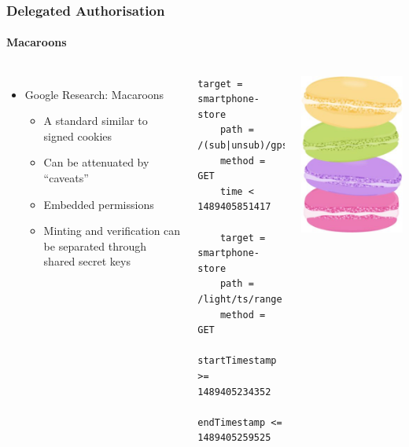 \documentclass[aspectratio=169]{beamer}
\begin{document}
\begin{frame}[fragile]
	\frametitle{Delegated Authorisation}
	\framesubtitle{Macaroons}
	\begin{columns}[c]
		\begin{itemize}
			\item Google Research: Macaroons
			\begin{itemize}
				\item A standard similar to signed cookies
				\item Can be attenuated by ``caveats''
				\item Embedded permissions
				\item Minting and verification can be separated through shared secret keys
			\end{itemize}
		\end{itemize}
		\begin{lstlisting}[language=caveats]
    target = smartphone-store
    path = /(sub|unsub)/gps/*
    method = GET
    time < 1489405851417

    target = smartphone-store
    path = /light/ts/range
    method = GET
    startTimestamp >= 1489405234352
    endTimestamp <= 1489405259525
		\end{lstlisting}
		\centering
		\includegraphics[height=\textwidth]{macaroons}
	\end{columns}
\end{frame}
\end{document}

